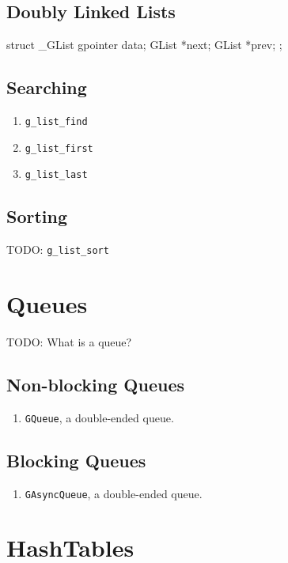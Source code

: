 \subsection{Doubly Linked Lists}

\begin{code}{}
struct _GList
{
    gpointer data;
    GList *next;
    GList *prev;
};
\end{code}

\subsection{Searching}

\begin{enumerate}
\item \verb|g_list_find|
\item \verb|g_list_first|
\item \verb|g_list_last|
\end{enumerate}

\subsection{Sorting}

TODO: \verb|g_list_sort|

\section{Queues}

TODO: What is a queue?

\subsection{Non-blocking Queues}

\begin{enumerate}
\item \verb|GQueue|, a double-ended queue.
\end{enumerate}

\subsection{Blocking Queues}

\begin{enumerate}
\item \verb|GAsyncQueue|, a double-ended queue.
\end{enumerate}

\section{HashTables}

